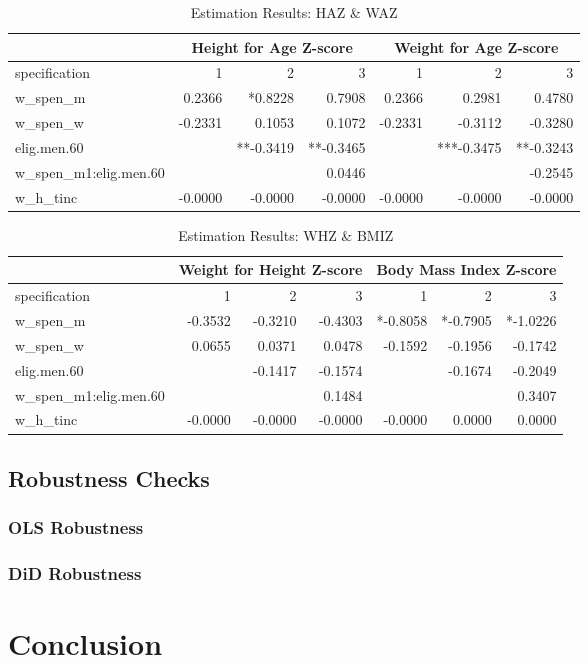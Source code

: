 \begin{refsection}
\begin{table}[h!]
\centering
\caption{Estimation Results: HAZ \& WAZ}
\label{sa:hazwaz}
\begin{tabular}{l|rrr|rrr}
& \multicolumn{3}{c}{Height for Age Z-score} & \multicolumn{3}{c}{Weight for Age Z-score}\\
\hline
specification & 1 & 2 & 3 & 1 & 2 & 3\\
\hline
w\_spen\_m & 0.2366 & *0.8228 & 0.7908 & 0.2366 & 0.2981 & 0.4780 \\
w\_spen\_w & -0.2331 & 0.1053 & 0.1072 & -0.2331 & -0.3112 & -0.3280 \\
elig.men.60 & & **-0.3419 & **-0.3465 & & ***-0.3475 & **-0.3243 \\
w\_spen\_m1:elig.men.60 & & & 0.0446 & & & -0.2545 \\
w\_h\_tinc & -0.0000 & -0.0000 & -0.0000 & -0.0000 & -0.0000 & -0.0000 \\
\end{tabular}
\end{table}

\begin{table}[h!]
\centering
\caption{Estimation Results: WHZ \& BMIZ}
\label{sa:whzbmiz}
\begin{tabular}{l|rrr|rrr}
& \multicolumn{3}{c}{Weight for Height Z-score} & \multicolumn{3}{c}{Body Mass Index Z-score}\\
\hline
specification & 1 & 2 & 3 & 1 & 2 & 3 \\
\hline
w\_spen\_m &  -0.3532 & -0.3210 & -0.4303 & *-0.8058 & *-0.7905 & *-1.0226 \\
w\_spen\_w & 0.0655 & 0.0371 & 0.0478 & -0.1592 & -0.1956 & -0.1742 \\
elig.men.60 & & -0.1417 & -0.1574 & & -0.1674 & -0.2049 \\
w\_spen\_m1:elig.men.60 & & & 0.1484 & & & 0.3407 \\
w\_h\_tinc & -0.0000 & -0.0000 & -0.0000 & -0.0000 & 0.0000 & 0.0000
\end{tabular}
\end{table}



\subsection{Robustness Checks}

\subsubsection{OLS Robustness}

\subsubsection{DiD Robustness}

\section{Conclusion}

\printbibliography
\end{refsection}